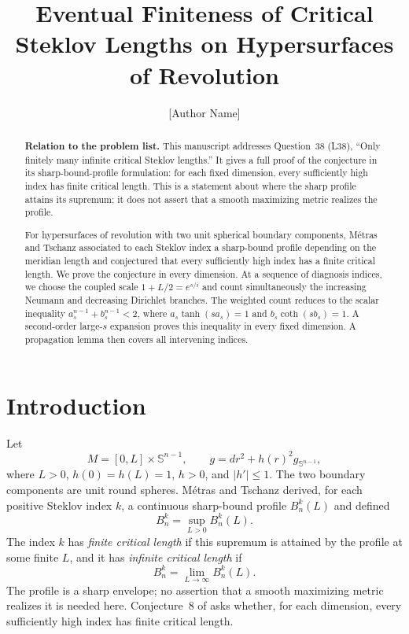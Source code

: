 \documentclass[11pt]{article}
\title{Eventual Finiteness of Critical Steklov Lengths on Hypersurfaces of Revolution}
\author{[Author Name]}
\date{}
\theoremstyle{remark}
\begin{document}
\maketitle

\begin{abstract}
\textbf{Relation to the problem list.}
This manuscript addresses Question~38 (L38), ``Only finitely many infinite
critical Steklov lengths.''  It gives a full proof of the conjecture in its
sharp-bound-profile formulation: for each fixed dimension, every sufficiently
high index has finite critical length.  This is a statement about where the
sharp profile attains its supremum; it does not assert that a smooth maximizing
metric realizes the profile.

For hypersurfaces of revolution with two unit spherical boundary components,
M\'{e}tras and Tschanz associated to each Steklov index a sharp-bound profile
depending on the meridian length and conjectured that every sufficiently high
index has a finite critical length.  We prove the conjecture in every
dimension.  At a sequence of diagnosis indices, we choose the coupled scale
$1+L/2=e^{s/i}$ and count simultaneously the increasing Neumann and
decreasing Dirichlet branches.  The weighted count reduces to the scalar
inequality $a_s^{n-1}+b_s^{n-1}<2$, where
$a_s\tanh(sa_s)=1$ and $b_s\coth(sb_s)=1$.  A second-order large-$s$
expansion proves this inequality in every fixed dimension.  A propagation
lemma then covers all intervening indices.
\end{abstract}

\section{Introduction}

Let
\[
 M=[0,L]\times\mathbb S^{n-1},
 \qquad
 g=dr^2+h(r)^2g_{\mathbb S^{n-1}},
\]
where $L>0$, $h(0)=h(L)=1$, $h>0$, and $|h'|\le1$.  The two boundary
components are unit round spheres.  M\'{e}tras and Tschanz derived, for
each positive Steklov index $k$, a continuous sharp-bound profile
$B_n^k(L)$ and defined
\[
 B_n^k=\sup_{L>0}B_n^k(L).
\]
The index $k$ has \emph{finite critical length} if this supremum is attained
by the profile at some finite $L$, and it has \emph{infinite critical length}
if
\[
 B_n^k=\lim_{L\to\infty}B_n^k(L).
\]
The profile is a sharp envelope; no assertion that a smooth maximizing
metric realizes it is needed here.  Conjecture~8 of \cite{MetrasTschanz}
asks whether, for each dimension, every sufficiently high index has finite
critical length.
\end{document}

